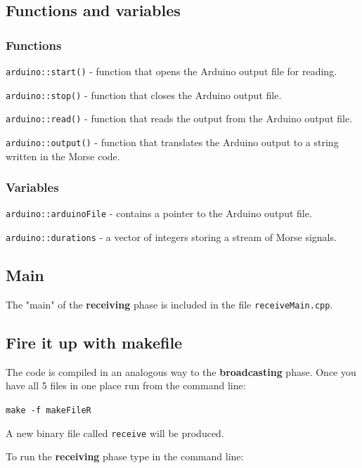 \documentclass[10pt]{report}
\begin{document}
\subsection{Functions and variables}

\subsubsection{Functions}

\verb|arduino::start()| - function that opens the Arduino output file for reading.

\verb|arduino::stop()| - function that closes the Arduino output file.

\verb|arduino::read()| - function that reads the output from the Arduino output file.

\verb|arduino::output()| - function that translates the Arduino output to a string written in the Morse code.

\subsubsection{Variables}

\verb|arduino::arduinoFile| - contains a pointer to the Arduino output file.

\verb|arduino::durations| - a vector of integers storing a stream of Morse signals.

\subsection{Main}

The "main" of the \textbf{receiving} phase is included in the file \verb|receiveMain.cpp|. 

\subsection{Fire it up with makefile}

The code is compiled in an analogous way to the \textbf{broadcasting} phase. Once you have all 5 files in one place run from the command line:

\begin{snugshade}
\verb|make -f makeFileR|
\end{snugshade}

A new binary file called \verb|receive| will be produced.

To run the \textbf{receiving} phase type in the command line:
\end{document}
